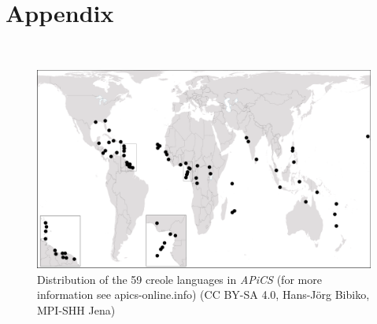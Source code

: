 \documentclass[output=paper]{langsci/langscibook}
\begin{document}
\clearpage
\section*{Appendix}
~
\begin{figure}[h!]
\includegraphics[width=\textwidth]{figures/Michaelis-Fig1.png}
\caption{Distribution of the 59 creole languages in \textit{APiCS} (for more information see apics-online.info) (CC BY-SA 4.0, Hans-Jörg Bibiko, MPI-SHH Jena)}
\label{fig:michaelis:1}
\end{figure}

\sloppy
\printbibliography[heading=subbibliography,notkeyword=this] 
\end{document}
